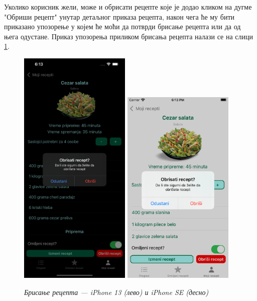 \documentclass[12pt,oneside]{memoir}
\begin{document}
\indent Уколико корисник жели, може и обрисати рецепте које је додао кликом на дугме "Обриши рецепт" унутар детаљног приказа рецепта, након чега ће му бити приказано упозорење у којем ће моћи да потврди брисање рецепта или да од њега одустане. Приказ упозорења приликом брисања рецепта налази се на слици \ref{slika:брисање_рецепта_1}.

\begin{figure} [H]
    \centering
    \captionsetup{justification=centering}
    \includegraphics[width=0.475\textwidth]{images/simulators/view images/dark - delete.png} 
    \hfill
    \includegraphics[width=0.475\textwidth]{images/simulators/view images/light - delete.png}
    \caption{\textit{Брисање рецепта --- iPhone 13 (лево) и iPhone SE (десно)}}
    \label{slika:брисање_рецепта_1} 
\end{figure}
\end{document}
